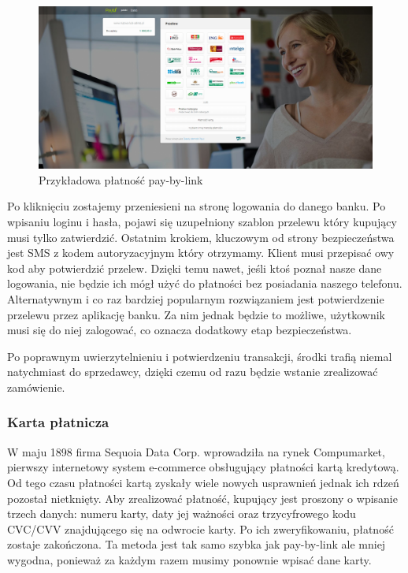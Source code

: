 \documentclass[12pt]{article}
\numberwithin{figure}{section}
\begin{document}
\begin{figure}[H] 
 	\centering
	\includegraphics[width=1\textwidth]{images/chapter_2/pay-by-link.png}
	\caption{Przykładowa płatność pay-by-link}
	\label{fig:pay-by-link}
\end{figure}

Po kliknięciu zostajemy przeniesieni na stronę logowania do danego banku. Po wpisaniu loginu i hasła, pojawi się uzupełniony szablon przelewu który kupujący musi tylko zatwierdzić. Ostatnim krokiem, kluczowym od strony bezpieczeństwa jest SMS z kodem autoryzacyjnym który otrzymamy. Klient musi przepisać owy kod aby potwierdzić przelew. Dzięki temu nawet, jeśli ktoś poznał nasze dane logowania, nie będzie ich mógł użyć do płatności bez posiadania naszego telefonu. Alternatywnym i co raz bardziej popularnym rozwiązaniem jest potwierdzenie przelewu przez aplikację banku. Za nim jednak będzie to możliwe, użytkownik musi się do niej zalogować, co oznacza dodatkowy etap bezpieczeństwa.

Po poprawnym uwierzytelnieniu i potwierdzeniu transakcji, środki trafią niemal natychmiast do sprzedawcy, dzięki czemu od razu będzie wstanie zrealizować zamówienie.

\subsubsection{Karta płatnicza} \label{sec:cards}
W maju 1898 firma Sequoia Data Corp. wprowadziła na rynek Compumarket, pierwszy internetowy system e-commerce obsługujący płatności kartą kredytową. Od tego czasu płatności kartą zyskały wiele nowych usprawnień jednak ich rdzeń pozostał nietknięty. Aby zrealizować płatność, kupujący jest proszony o wpisanie trzech danych: numeru karty, daty jej ważności oraz trzycyfrowego kodu CVC/CVV znajdującego się na odwrocie karty. Po ich zweryfikowaniu, płatność zostaje zakończona. Ta metoda jest tak samo szybka jak pay-by-link ale mniej wygodna, ponieważ za każdym razem musimy ponownie wpisać dane karty. 
\end{document}
